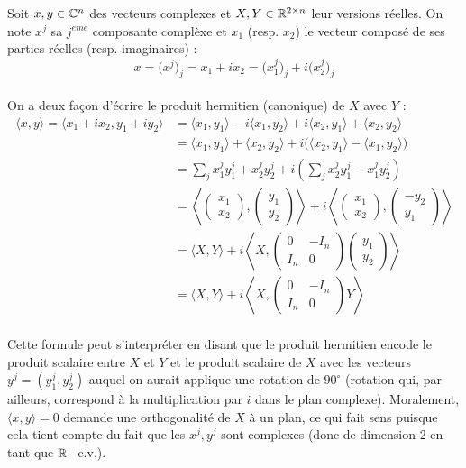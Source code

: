 Soit $x,y\in\mathbb{C}^n$ des vecteurs complexes et $X,Y\in\mathbb{R}^{2\times n}$ leur versions réelles. On note $x^j$ sa $j^{eme}$ composante complèxe et $x_1$ (resp. $x_2$) le vecteur composé de ses parties réelles (resp. imaginaires) :
\[x = \big(x^j\big)_j =  x_1 + ix_2 =  \big(x^j_1\big)_j +i \big(x^j_2\big)_j\]
\\
On a deux façon d'écrire le produit hermitien (canonique) de $X$ avec $Y$ :
\begin{align*}
	\langle x,y \rangle = \langle x_1 + ix_2, y_1 + iy_2\rangle &= \langle x_1, y_1\rangle - i \langle x_1,y_2\rangle +i\langle x_2, y_1\rangle + \langle x_2, y_2\rangle  \\
	&= \langle x_1, y_1\rangle + \langle x_2, y_2\rangle 
	+ i\big(\langle x_2, y_1\rangle - \langle x_1,y_2\rangle\big) \\
	&= \sum_j x^j_1 y^j_1+ x^j_2 y^j_2
	+ i\left(\sum_j x^j_2 y^j_1 -  x^j_1y^j_2\right) \\
	&= \left\langle \begin{pmatrix} x_1 \\ x_2 \end{pmatrix},\begin{pmatrix} y_1 \\ y_2 \end{pmatrix}\right\rangle
	+ i\left\langle \begin{pmatrix} x_1 \\ x_2 \end{pmatrix},\begin{pmatrix} -y_2 \\ y_1 \end{pmatrix}\right\rangle \\
	&= \Big\langle X,Y\Big\rangle 
	+ i\left\langle X,\begin{pmatrix} 0 & -I_n \\ I_n & 0 \end{pmatrix}\begin{pmatrix} y_1 \\ y_2 \end{pmatrix}\right\rangle\\
	&= \Big\langle X,Y\Big\rangle 
	+ i\left\langle X,\begin{pmatrix} 0 & -I_n \\ I_n & 0 \end{pmatrix}Y\right\rangle
\end{align*}
\\
Cette formule peut s’interpréter en disant que le produit hermitien encode le produit scalaire entre $X$ et $Y$ et le produit scalaire de $X$ avec les vecteurs $y^j=(y^j_1, y^j_2)$  auquel on aurait applique une rotation de $90^\circ$ (rotation qui, par ailleurs, correspond à la multiplication par $i$ dans le plan complexe). Moralement, $\langle x,y \rangle =0$ demande une orthogonalité de $X$ à un plan, ce qui fait sens puisque cela tient compte du fait que les $x^j, y^j$ sont complexes (donc de dimension 2 en tant que $\mathbb{R}-$e.v.).
